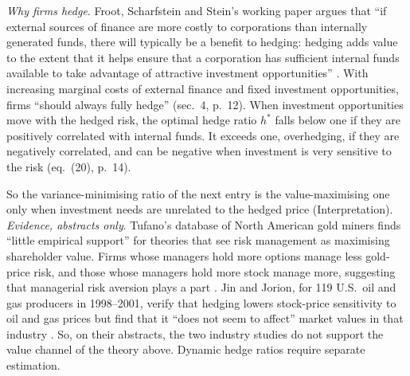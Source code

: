 \begin{qfdefinition}
 \emph{Why firms hedge}. Froot, Scharfstein and Stein's working paper argues that ``if external sources of finance are more costly to corporations than internally generated funds, there will typically be a benefit to hedging: hedging adds value to the extent that it helps ensure that a corporation has sufficient internal funds available to take advantage of attractive investment opportunities'' \citep[NBER WP~4084, May 1992, abstract]{ec-froot-scharfstein-stein-1993}. With increasing marginal costs of external finance and fixed investment opportunities, firms ``should always fully hedge'' (sec.~4, p.~12). When investment opportunities move with the hedged risk, the optimal hedge ratio $h^*$ falls below one if they are positively correlated with internal funds. It exceeds one, overhedging, if they are negatively correlated, and can be negative when investment is very sensitive to the risk (eq.~(20), p.~14).

So the variance-minimising ratio of the next entry is the value-maximising one only when investment needs are unrelated to the hedged price (Interpretation). \emph{Evidence, abstracts only}. Tufano's database of North American gold miners finds ``little empirical support'' for theories that see risk management as maximising shareholder value. Firms whose managers hold more options manage less gold-price risk, and those whose managers hold more stock manage more, suggesting that managerial risk aversion plays a part \citep[abstract]{ec-tufano-1996}. Jin and Jorion, for 119 U.S.\ oil and gas producers in 1998--2001, verify that hedging lowers stock-price sensitivity to oil and gas prices but find that it ``does not seem to affect'' market values in that industry \citep[abstract]{ec-jin-jorion-2006}. So, on their abstracts, the two industry studies do not support the value channel of the theory above. Dynamic hedge ratios require separate estimation.

\end{qfdefinition}

